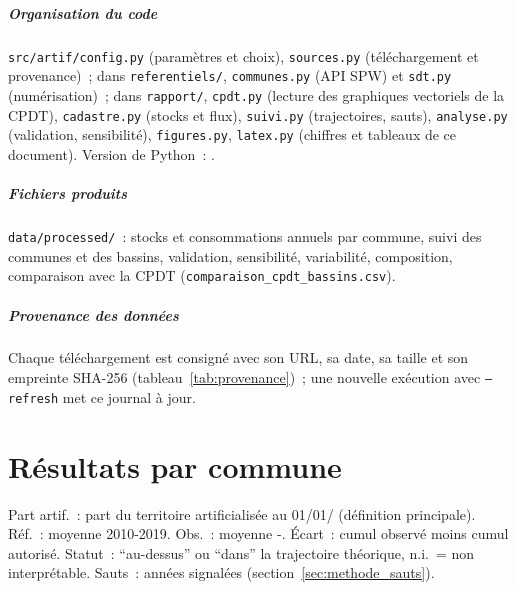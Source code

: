\documentclass[11pt,a4paper]{report}
\newcommand{\fichier}[1]{\texttt{\small #1}}
\begin{document}
\paragraph{Organisation du code} \fichier{src/artif/config.py} (paramètres et choix), \fichier{sources.py} (téléchargement et provenance)~; dans \fichier{referentiels/}, \fichier{communes.py} (API SPW) et \fichier{sdt.py} (numérisation)~; dans \fichier{rapport/}, \fichier{cpdt.py} (lecture des graphiques vectoriels de la CPDT), \fichier{cadastre.py} (stocks et flux), \fichier{suivi.py} (trajectoires, sauts), \fichier{analyse.py} (validation, sensibilité), \fichier{figures.py}, \fichier{latex.py} (chiffres et tableaux de ce document). Version de Python~: \PythonVersion.
\paragraph{Fichiers produits} \fichier{data/processed/}~: stocks et consommations annuels par commune, suivi des communes et des bassins, validation, sensibilité, variabilité, composition, comparaison avec la CPDT (\fichier{comparaison\_cpdt\_bassins.csv}).
\paragraph{Provenance des données} Chaque téléchargement est consigné avec son URL, sa date, sa taille et son empreinte SHA-256 (tableau~\ref{tab:provenance})~; une nouvelle exécution avec \fichier{--refresh} met ce journal à jour.
\begin{table}[H]
\centering\scriptsize
\caption{Sources téléchargées par la chaîne (extrait de \fichier{data/raw/PROVENANCE.json}).}
\label{tab:provenance}

\end{table}

\chapter{Résultats par commune}
\label{ann:communes}
{\scriptsize
Part artif.~: part du territoire artificialisée au 01/01/\AnneeStock{} (définition principale). Réf.~: moyenne 2010-2019. Obs.~: moyenne \AnneeDebutObs-\AnneeFinObs. Écart~: cumul observé moins cumul autorisé. Statut~: \enquote{au-dessus} ou \enquote{dans} la trajectoire théorique, n.i.~= non interprétable. Sauts~: années signalées (section~\ref{sec:methode_sauts}).
\setlength{\tabcolsep}{4pt}

}
\end{document}
